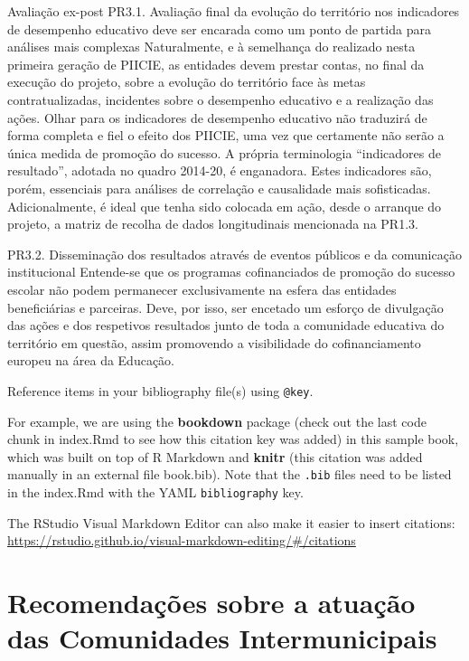 \documentclass[
]{book}
\begin{document}
Avaliação ex-post
PR3.1. Avaliação final da evolução do território nos indicadores de desempenho educativo deve ser encarada como um ponto de partida para análises mais complexas
Naturalmente, e à semelhança do realizado nesta primeira geração de PIICIE, as entidades devem prestar contas, no final da execução do projeto, sobre a evolução do território face às metas contratualizadas, incidentes sobre o desempenho educativo e a realização das ações.
Olhar para os indicadores de desempenho educativo não traduzirá de forma completa e fiel o efeito dos PIICIE, uma vez que certamente não serão a única medida de promoção do sucesso. A própria terminologia ``indicadores de resultado'', adotada no quadro 2014-20, é enganadora. Estes indicadores são, porém, essenciais para análises de correlação e causalidade mais sofisticadas.
Adicionalmente, é ideal que tenha sido colocada em ação, desde o arranque do projeto, a matriz de recolha de dados longitudinais mencionada na PR1.3.

PR3.2. Disseminação dos resultados através de eventos públicos e da comunicação institucional
Entende-se que os programas cofinanciados de promoção do sucesso escolar não podem permanecer exclusivamente na esfera das entidades beneficiárias e parceiras. Deve, por isso, ser encetado um esforço de divulgação das ações e dos respetivos resultados junto de toda a comunidade educativa do território em questão, assim promovendo a visibilidade do cofinanciamento europeu na área da Educação.

Reference items in your bibliography file(s) using \texttt{@key}.

For example, we are using the \textbf{bookdown} package \citep{R-bookdown} (check out the last code chunk in index.Rmd to see how this citation key was added) in this sample book, which was built on top of R Markdown and \textbf{knitr} \citep{xie2015} (this citation was added manually in an external file book.bib).
Note that the \texttt{.bib} files need to be listed in the index.Rmd with the YAML \texttt{bibliography} key.

The RStudio Visual Markdown Editor can also make it easier to insert citations: \url{https://rstudio.github.io/visual-markdown-editing/\#/citations}

\hypertarget{recomendauxe7uxf5es-sobre-a-atuauxe7uxe3o-das-comunidades-intermunicipais-1}{%
\section{Recomendações sobre a atuação das Comunidades Intermunicipais}\label{recomendauxe7uxf5es-sobre-a-atuauxe7uxe3o-das-comunidades-intermunicipais-1}}
\end{document}
